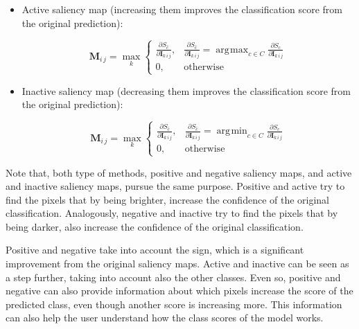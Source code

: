 \documentclass[preprint,12pt]{elsarticle}
\DeclareMathOperator*{\argmax}{arg\!max}
\DeclareMathOperator*{\argmin}{arg\!min}
\begin{document}
\begin{itemize}
    \item Active saliency map (increasing them improves the classification score from the original prediction):
    
    \begin{equation}
      \boldsymbol{M}_{i\, j} = \max_{k}
        \begin{cases}
            \frac{\partial S_{\hat{c}}}{\partial \boldsymbol{I}_{k\, i\, j}}, & \frac{\partial S_{\hat{c}}}{\partial \boldsymbol{I}_{k\, i\, j}} = \argmax_{c \in C}\frac{\partial S_{c}}{\partial \boldsymbol{I}_{k\, i\, j}} \\
            0, & \text{otherwise}
        \end{cases}
        \label{eq: active saliency map}
    \end{equation}

    \item Inactive saliency map (decreasing them improves the classification score from the original prediction):
    
    \begin{equation}
      \boldsymbol{M}_{i\, j} = \max_{k}
        \begin{cases}
            \frac{\partial S_{\hat{c}}}{\partial \boldsymbol{I}_{k\, i\, j}}, & \frac{\partial S_{\hat{c}}}{\partial \boldsymbol{I}_{k\, i\, j}} = \argmin_{c \in C}\frac{\partial S_{c}}{\partial \boldsymbol{I}_{k\, i\, j}} \\
            0, & \text{otherwise}
        \end{cases}
        \label{eq: inactive saliency map}
    \end{equation}

\end{itemize}

Note that, both type of methods, positive and negative saliency maps, and active and inactive saliency maps, pursue the same purpose. Positive and active try to find the pixels that by being brighter, increase the confidence of the original classification. Analogously, negative and inactive try to find the pixels that by being darker, also increase the confidence of the original classification.

Positive and negative take into account the sign, which is a significant improvement from the original saliency maps. Active and inactive can be seen as a step further, taking into account also the other classes. Even so, positive and negative can also provide information about which pixels increase the score of the predicted class, even though another score is increasing more. This information can also help the user understand how the class scores of the model works.
\end{document}
